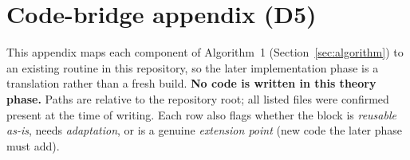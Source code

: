 \appendix
\section{Code-bridge appendix (D5)}
\label{sec:codebridge}

This appendix maps each component of Algorithm~1 (Section~\ref{sec:algorithm}) to
an existing routine in this repository, so the later implementation phase is a
translation rather than a fresh build. \textbf{No code is written in this
theory phase.} Paths are relative to the repository root; all listed files were
confirmed present at the time of writing. Each row also flags whether the block is
\emph{reusable as-is}, needs \emph{adaptation}, or is a genuine \emph{extension
point} (new code the later phase must add).

